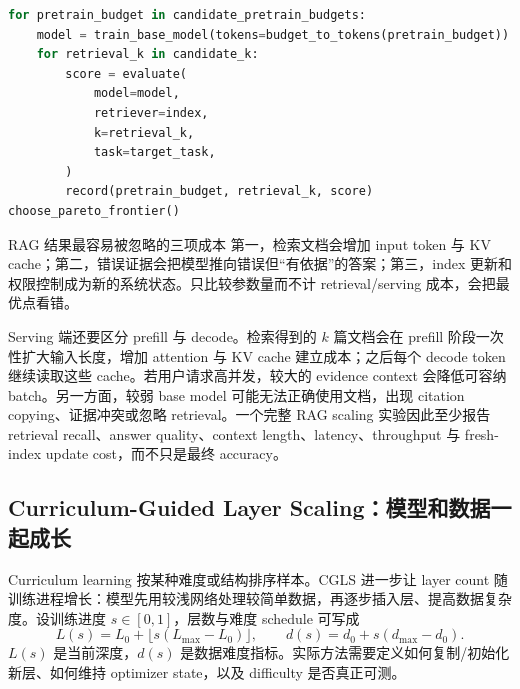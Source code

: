 


\begin{lstlisting}[language=Python,caption={固定预算下搜索 pretraining 与 retrieval 分配的伪代码}]
for pretrain_budget in candidate_pretrain_budgets:
    model = train_base_model(tokens=budget_to_tokens(pretrain_budget))
    for retrieval_k in candidate_k:
        score = evaluate(
            model=model,
            retriever=index,
            k=retrieval_k,
            task=target_task,
        )
        record(pretrain_budget, retrieval_k, score)
choose_pareto_frontier()
\end{lstlisting}

\begin{warningbox}{RAG 结果最容易被忽略的三项成本}
第一，检索文档会增加 input token 与 KV cache；第二，错误证据会把模型推向错误但“有依据”的答案；第三，index 更新和权限控制成为新的系统状态。只比较参数量而不计 retrieval/serving 成本，会把最优点看错。
\end{warningbox}

Serving 端还要区分 prefill 与 decode。检索得到的 $k$ 篇文档会在 prefill 阶段一次性扩大输入长度，增加 attention 与 KV cache 建立成本；之后每个 decode token 继续读取这些 cache。若用户请求高并发，较大的 evidence context 会降低可容纳 batch。另一方面，较弱 base model 可能无法正确使用文档，出现 citation copying、证据冲突或忽略 retrieval。一个完整 RAG scaling 实验因此至少报告 retrieval recall、answer quality、context length、latency、throughput 与 fresh-index update cost，而不只是最终 accuracy。

\subsection{Curriculum-Guided Layer Scaling：模型和数据一起成长}

Curriculum learning 按某种难度或结构排序样本。CGLS 进一步让 layer count 随训练进程增长：模型先用较浅网络处理较简单数据，再逐步插入层、提高数据复杂度。设训练进度 $s\in[0,1]$，层数与难度 schedule 可写成
\[
L(s)=L_0+\lfloor s(L_{\max}-L_0)\rfloor,
\qquad d(s)=d_0+s(d_{\max}-d_0).
\]
$L(s)$ 是当前深度，$d(s)$ 是数据难度指标。实际方法需要定义如何复制/初始化新层、如何维持 optimizer state，以及 difficulty 是否真正可测。


